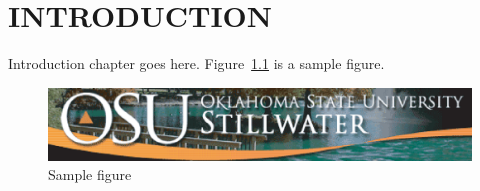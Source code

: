  \chapter{INTRODUCTION}\label{chap:intro}
 Introduction chapter goes here.  Figure~\ref{fig:intro:fig1} is a sample figure.
\begin{figure}[h]
\includegraphics[width=5.5in]{osu.eps}
\caption{Sample figure}
\label{fig:intro:fig1}
\end{figure}